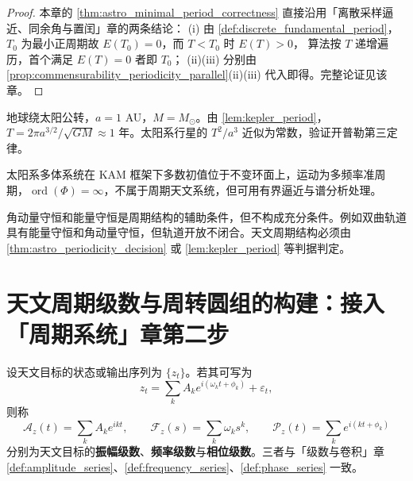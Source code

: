 \begin{proof}
本章的 \cref{thm:astro_minimal_period_correctness} 直接沿用「离散采样逼近、同余角与置闰」章的两条结论：
(i) 由 \cref{def:discrete_fundamental_period}，$T_0$ 为最小正周期故 $E(T_0)=0$，而 $T<T_0$ 时 $E(T)>0$，
算法按 $T$ 递增遍历，首个满足 $E(T)=0$ 者即 $T_0$；
(ii)(iii) 分别由 \cref{prop:commensurability_periodicity_parallel}(ii)(iii) 代入即得。完整论证见该章。
\end{proof}

\begin{example}[开普勒轨道周期判定实例]\label{ex:astro_kepler_period}
地球绕太阳公转，\(a=1\) AU，\(M=M_\odot\)。由 \cref{lem:kepler_period}，\(T=2\pi a^{3/2}/\sqrt{GM}\approx1\) 年。太阳系行星的 \(T^2/a^3\) 近似为常数，验证开普勒第三定律。
\end{example}

\begin{example}[多体系统的准周期判定]\label{ex:astro_nbody_quasiperiodic}
太阳系多体系统在 KAM 框架下多数初值位于不变环面上，运动为多频率准周期，\(\operatorname{ord}(\Phi)=\infty\)，不属于周期天文系统，但可用有界逼近与谱分析处理。
\end{example}

\begin{remark}[守恒量不保证周期]\label{rem:astro_invariant_not_period}
角动量守恒和能量守恒是周期结构的辅助条件，但不构成充分条件。例如双曲轨道具有能量守恒和角动量守恒，但轨道开放不闭合。天文周期结构必须由 \cref{thm:astro_periodicity_decision} 或 \cref{lem:kepler_period} 等判据判定。
\end{remark}

\section{天文周期级数与周转圆组的构建：接入「周期系统」章第二步}
\label{sec:astro_series_construction}

\begin{definition}\label{def:astro_series}
设天文目标的状态或输出序列为 \(\{z_t\}\)。若其可写为
\[
z_t=\sum_k A_k e^{i(\omega_k t+\phi_k)}+\varepsilon_t,
\]
则称
\[
\mathcal A_z(t)=\sum_k A_k e^{ikt},\qquad
\mathcal F_z(s)=\sum_k \omega_k s^k,\qquad
\mathcal P_z(t)=\sum_k e^{i(kt+\phi_k)}
\]
分别为天文目标的\textbf{振幅级数}、\textbf{频率级数}与\textbf{相位级数}。三者与「级数与卷积」章 \cref{def:amplitude_series}、\cref{def:frequency_series}、\cref{def:phase_series} 一致。
\end{definition}

